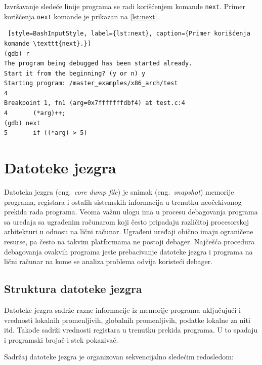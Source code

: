 \documentclass[12pt,oneside]{memoir}
\begin{document}
\begin{description}
Izvršavanje sledeće linije programa se radi korišćenjem komande \texttt{next}. Primer korišćenja \texttt{next} komande je prikazan na \ref{lst:next}.

\begin{lstlisting} [style=BashInputStyle, label={lst:next}, caption={Primer korišćenja komande \texttt{next}.}]
(gdb) r
The program being debugged has been started already.
Start it from the beginning? (y or n) y
Starting program: /master_examples/x86_arch/test 
4
Breakpoint 1, fn1 (arg=0x7fffffffdbf4) at test.c:4
4		(*arg)++;
(gdb) next
5	    if ((*arg) > 5)
\end{lstlisting}

\end{description}


\section{Datoteke jezgra}

Datoteka jezgra (eng.~\emph{core dump file}) je snimak (eng.~\emph{snapshot}) memorije programa, registara i ostalih sistemskih informacija u trenutku neočekivanog prekida rada programa. Veoma važnu ulogu ima u procesu debagovanja programa sa uređaja sa ugrađenim računarom koji često pripadaju različitoj procesorskoj arhitekturi u odnosu na lični računar. Ugrađeni uređaji obično imaju ograničene resurse, pa često na takvim platformama ne postoji debager. Najčešća procedura debagovanja ovakvih programa jeste prebacivanje datoteke jezgra i programa na lični računar na kome se analiza problema odvija koristeći debager.

\subsection{Struktura datoteke jezgra}

Datoteke jezgra sadrže razne informacije iz memorije programa uključujući i vrednosti lokalnih promenljivih, globalnih promenljivih, podatke lokalne za niti itd. Takođe sadrži vrednosti registara u trenutku prekida programa. U to spadaju i programski brojač i stek pokazivač.

Sadržaj datoteke jezgra je organizovan sekvencijalno sledećim redosledom:
\end{document}
